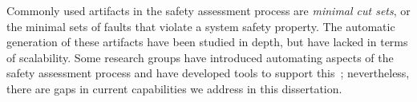 Commonly used artifacts in the safety assessment process are \emph{minimal cut sets}, or the minimal sets of faults that violate a system safety property. The automatic generation of these artifacts have been studied in depth, but have lacked in terms of scalability. Some research groups have introduced automating aspects of the safety assessment process and have developed tools to support this~\cite{Joshi05:SafeComp,CAV2015:BoCiGrMa,10.1007/978-3-319-11936-6-7}; nevertheless, there are gaps in current capabilities we address in this dissertation. 







